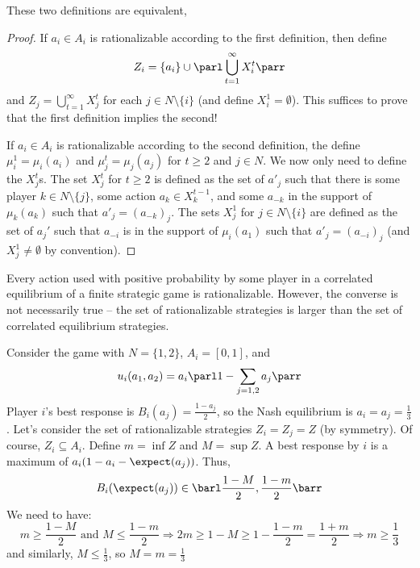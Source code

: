 \documentclass[10pt]{article}
\begin{document}
\begin{proposition}
	These two definitions are equivalent, 
\end{proposition}
\begin{proof}
	If $a_i \in A_i$ is rationalizable according to the first definition, then define \[Z_i = \{a_i \} \cup \parl \bigcup_{t=1}^\infty X_i^t\parr \]and $Z_j = \bigcup_{t=1}^\infty X_j^t$ for each $j \in N\setminus \{i\}$ (and define $X_i^1 = \emptyset$). This suffices to prove that the first definition implies the second!
	
	If $a_i \in A_i$ is rationalizable according to the second definition, the define $\mu_i^1 = \mu_i(a_i)$ and $\mu_j^t = \mu_j(a_j)$ for $t \ge 2$ and $j \in N$. We now only need to define the $X^t_j$s. The set $X^t_j$ for $t \ge 2$ is defined as the set of $a'_j$ such that there is some player $k \in N \setminus \{j\}$, some action $a_k \in X^{t-1}_k$, and some $a_{-k}$ in the support of $\mu_k(a_k)$ such that $a'_j = (a_{-k})_j$. The sets $X_j^1$ for $j \in N \setminus \{i\}$ are defined as the set of $a_j'$ such that $a_{-i}$ is in the support of $\mu_i(a_1)$ such that $a'_j = (a_{-i})_j$ (and $X^1_j \ne \emptyset$ by convention).
\end{proof}

\begin{remark}
	Every action used with positive probability by some player in a correlated equilibrium of a finite strategic game is rationalizable. However, the converse is not necessarily true -- the set of rationalizable strategies is larger than the set of correlated equilibrium strategies.
\end{remark}


\begin{example}
	 Consider the game with $N = \{1,2\}$, $A_i = [0,1]$, and \[u_i(a_1,a_2) = a_i \parl 1 - \sum_{j=1,2} a_j\parr\] Player $i$'s best response is $B_i(a_j) = \frac{1-a_j}{2}$, so the Nash equilibrium is $a_i = a_j = \frac{1}{3}$. Let's consider the set of rationalizable strategies $Z_i = Z_j = Z$ (by symmetry). Of course, $Z_i \subseteq A_i$. Define $m = \inf Z$ and $M = \sup Z$. A best response by $i$ is a maximum of $a_i(1 - a_i - \expect(a_j))$. Thus, \[B_i(\expect(a_j)) \in \barl \frac{1-M}{2},\frac{1-m}{2}\barr\] We need to have: \[m \ge \frac{1-M}{2} \text{ and } M \le \frac{1-m}{2} \Longrightarrow 2m \ge 1-M \ge 1 - \frac{1-m}{2} = \frac{1+m}{2} \Longrightarrow m \ge \frac{1}{3}\]and similarly, $M \le \frac{1}{3}$, so $M = m = \frac{1}{3}$
\end{example}
\end{document}

